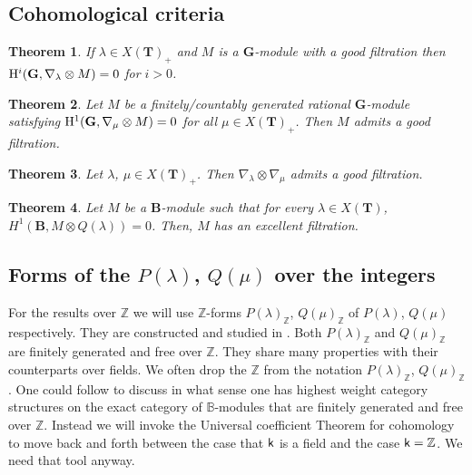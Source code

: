 \documentclass[sn-mathphys-num]{sn-jnl}%
\newcommand{\sk}{{\sf k}}
\newcommand{\Bm}{\mathbb B}
\newcommand{\Z}{{\mathbb Z}}
\newcommand{\bg}{\mathbf G}
\newcommand{\fb}{\mathbf B}
\newcommand{\bt}{\mathbf T}
\newtheorem{theorem}{Theorem}[section]
\theoremstyle{definition}
\begin{document}
\subsection{Cohomological criteria}

\begin{theorem}\cite[Theorem 1.1']{Donkin1}
If $\lambda \in X(\bt)_+$ and $M$ is a $ \bg$-module with a good  
filtration then ${\rm H}^i( \bg,\nabla _{\lambda}\otimes M)=0$ for $i>0$.
\end{theorem}

\begin{theorem}\cite[Theorem 4, Corollary 7]{Frid}\label{th:G criterion}
Let $M$ be a finitely/countably generated rational $ \bg$-module satisfying ${\rm H}^1( \bg,\nabla _{\mu}\otimes M)=0$ for all $\mu \in X(\bt)_+$. Then $M$ admits a good  filtration.

\end{theorem}

\begin{theorem}\label{th:good tensor}\cite[II Proposition 4.21, B.9]{Jan}
Let $\lambda$, $\mu\in X(\bt)_+$. Then $\nabla_\lambda\otimes\nabla_\mu$ admits a good  filtration.
\end{theorem}

\begin{theorem}\cite[Theorem 3.2.7]{WvdK}
    Let $M$ be a $\fb$-module such that for every $\lambda\in X(\bt)$, $H^1( \fb,M\otimes Q(\lambda))=0$. Then, $M$ has an excellent filtration.
\end{theorem}

\subsection{Forms of the $P(\lambda)$, $Q(\mu)$ over the integers}
For the results over $\Z$ we will use  $\Z$-forms $P(\lambda)_\Z$, $Q(\mu)_\Z$ of  $P(\lambda)$, $Q(\mu)$ respectively.
They are constructed and studied in \cite[Chapter 7]{WvdKTata}. Both  $P(\lambda)_\Z$ and $Q(\mu)_\Z$ are finitely generated and free over $\Z$. 
They share many properties with their counterparts over fields.
We often drop the $\Z$ from  the notation $P(\lambda)_\Z$, $Q(\mu)_\Z$.
One could
follow \cite[section 3]{Ef}
to discuss in what sense one has highest weight category structures on the exact category of $\Bm$-modules that are finitely generated and free over $\Z$.
 Instead we will invoke the Universal coefficient Theorem for cohomology to move back and forth between the case that $\sk$ is a field and the case $\sk=\Z$. We need that tool anyway.
 
\end{document}
